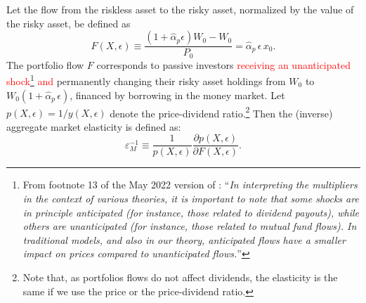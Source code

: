 Let the flow from the riskless asset to the risky asset, normalized by the value of the risky asset, be defined as 
\begin{equation}\label{eq:port-flows}
F(X,\epsilon) \equiv \frac{(1+\hat{\alpha}_{p}\epsilon) W_0 - W_0}{P_0} = \hat{\alpha}_p\, \epsilon\, x_0.
\end{equation}
The portfolio flow $ F $ corresponds to passive investors \textcolor{red}{receiving  an unanticipated shock\footnote{From footnote 13 of the May 2022 version of \cite{gabaix2020search}: ``\textit{In interpreting the multipliers in the context of various theories, it is important to note that some shocks are in principle anticipated (for instance, those related to dividend payouts), while others are unanticipated (for instance, those related to mutual fund flows). In traditional models, and also in our theory, anticipated flows have a smaller impact on prices compared to unanticipated flows.}''} and} permanently changing their risky asset holdings from $W_0$ to $W_0(1+\hat{\alpha}_p\,\epsilon)$, financed by borrowing in the money market. Let $ p(X,\epsilon)=1/y(X,\epsilon) $ denote the price-dividend ratio.\footnote{Note that, as portfolios flows do not affect dividends, the elasticity is the same if we use the price or the price-dividend ratio.} 
Then the (inverse) aggregate market elasticity is defined as:
\begin{equation}\label{eq:agg-elasticity}
	\varepsilon_M^{-1}\equiv\frac{1}{p(X,\epsilon)}\frac{\partial p(X,\epsilon)}{\partial F(X,\epsilon)}.
\end{equation}

